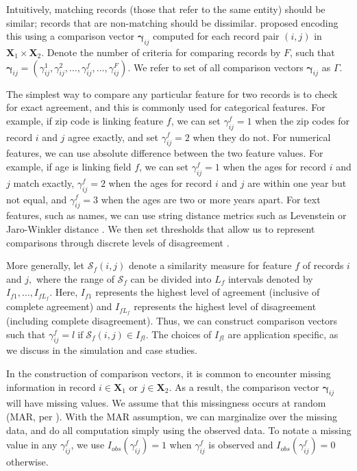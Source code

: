 \documentclass[ba]{imsart}
\begin{document}
Intuitively, matching records (those that refer to the same entity) should be similar; records that are non-matching should be dissimilar. \cite{fellegi_theory_1969} proposed encoding this using a comparison vector $\bm{\gamma}_{ij}$ computed for each record pair $(i,j)$ in $\bm{X}_1 \times \bm{X}_2.$ Denote the number of criteria for comparing records by $F$, such that $\bm{\gamma}_{ij} = (\gamma_{ij}^1, \gamma_{ij}^2, \ldots, \gamma_{ij}^f, \ldots, \gamma_{ij}^F).$ We refer to set of all comparison vectors $\bm{\gamma}_{ij}$ as $\Gamma$. 


The simplest way to compare any particular feature for two records is to check for exact agreement, and this is commonly used for categorical features. For example, if zip code is linking feature $f$, we can set $\gamma_{ij}^f=1$ when the zip codes for record $i$ and $j$ agree exactly, and set $\gamma_{ij}^f=2$ when they do not. For numerical features, we can use absolute difference between the two feature values. For example, if age is linking field $f$, we can set $\gamma_{ij}^f = 1$ when the ages for record $i$ and $j$ match exactly, $\gamma_{ij}^f = 2$ when the ages for record $i$ and $j$ are within one year but not equal, and $\gamma_{ij}^f = 3$ when the ages are two or more years apart. For text features, such as names, we can use string distance metrics such as Levenstein or Jaro-Winkler distance \citep{cohen2003comparison}. We then set thresholds that allow us to represent comparisons through discrete levels of disagreement \citep{bilenko2006riddle, elmagarmid_duplicate_2007}. 

More generally, let $\mathcal{S}_f(i,j)$ denote a similarity measure for feature $f$ of records $i$ and $j,$ where the range of $\mathcal{S}_f$ can be divided into $L_f$ intervals denoted by $I_{f1}, \ldots, I_{fL_f}$. Here, $I_{f1}$ represents the highest level of agreement (inclusive of complete agreement) and $I_{fL_f}$ represents the highest level of disagreement (including complete disagreement). Thus, we can construct comparison vectors such that $\gamma_{ij}^f = l \; \text{if} \; \mathcal{S}_f(i,j) \in I_{fl}.$ The choices of $I_{fl}$ are application specific, as we discuss in the simulation and case studies.

In the construction of comparison vectors, it is common to encounter missing information in record $i \in \bm{X}_1$ or $j \in \bm{X}_2$. As a result, the comparison vector $\mathbf{\gamma}_{ij}$ will have missing values. We assume that this missingness occurs at random (MAR, per \cite{LittleRubin2002}). With the MAR assumption, we can marginalize over the missing data, and do all computation simply using the observed data. To notate a missing value in any $\gamma_{ij}^f$, we use $I_{obs}(\gamma_{ij}^f)=1$ when $\gamma_{ij}^f$ is observed and $I_{obs}(\gamma_{ij}^f)=0$ otherwise.
\end{document}
